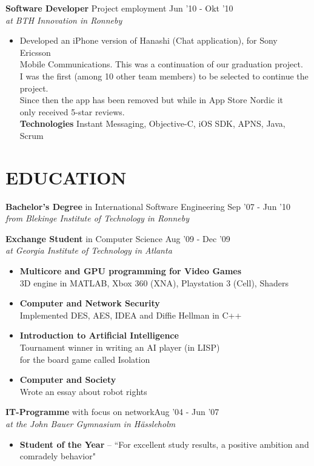 \documentclass[overlapped]{res}
\begin{document}
\begin{resume}
{\bf Software Developer} Project employment \hfill Jun '10 - Okt '10 \\
{\sl at BTH Innovation in Ronneby}
\begin{itemize}
\itemsep -1pt
\item Developed an iPhone version of Hanashi (Chat application), for Sony Ericsson \\Mobile Communications. This was a continuation of our graduation project. 
\\I was the first (among 10 other team members) to be selected to continue the project.
\\Since then the app has been removed but while in App Store Nordic it 
\\only received 5-star reviews.
\\{\bf Technologies} Instant Messaging, Objective-C, iOS SDK, APNS, Java, Scrum
\end{itemize}

\section{{\sc EDUCATION}}

{\bf Bachelor's Degree} in International Software Engineering \hfill Sep '07 - Jun '10\\
{\sl from Blekinge Institute of Technology in Ronneby}

{\bf Exchange Student} in Computer Science \hfill Aug '09 - Dec '09\\
{\sl at Georgia Institute of Technology in Atlanta}
\begin{itemize}
\itemsep -1pt
\item {\bf Multicore and GPU programming for Video Games}\\ 3D engine in MATLAB, Xbox 360 (XNA), Playstation 3 (Cell), Shaders 
\item {\bf Computer and Network Security}\\ Implemented DES, AES, IDEA and Diffie Hellman in C++
\item {\bf Introduction to Artificial Intelligence}\\ Tournament winner in writing an AI player (in LISP) \\for the board game called Isolation
\item {\bf Computer and Society} \\ Wrote an essay about robot rights
\end{itemize}

{\bf  IT-Programme} with focus on network\hfill Aug '04 - Jun '07\\
{\sl at the John Bauer Gymnasium in Hässleholm}
\begin{itemize}
\itemsep -1pt
\item {\bf Student of the Year}  -- ``For excellent study results, a positive ambition and \\comradely behavior"
\end{itemize}


\end{resume}
\end{document}
